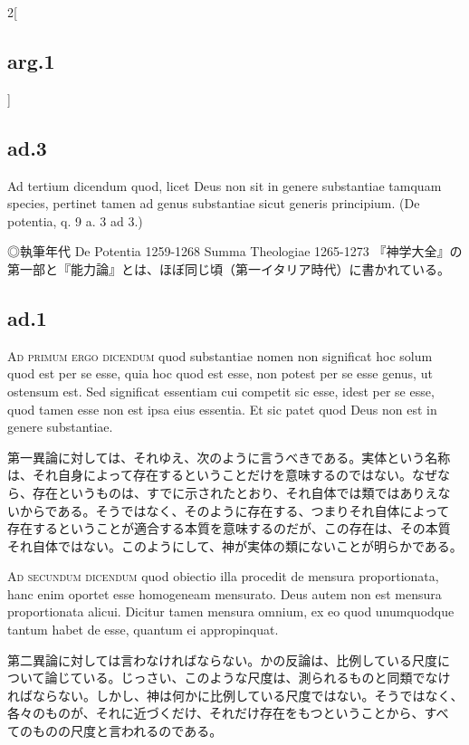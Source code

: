 \documentclass[paper=a4paper,fontsize=10pt,jafontsize=9pt,titlepage]{jlreq}
\begin{document}
\begin{paracol}{2}[\subsection{arg.1}]
{\subsection{ad.3}

Ad tertium dicendum quod, licet Deus non sit in genere substantiae
 tamquam species, pertinet tamen ad genus substantiae sicut generis
 principium. (De potentia, q. 9 a. 3 ad 3.)



◎執筆年代
De Potentia 1259-1268
Summa Theologiae 1265-1273
『神学大全』の第一部と『能力論』とは、ほぼ同じ頃（第一イタリア時代）に書かれている。
}

\subsection{ad.1}

{\scshape Ad primum ergo dicendum} quod substantiae nomen non
significat hoc solum quod est per se esse, quia hoc quod est esse, non
potest per se esse genus, ut ostensum est. Sed significat essentiam
cui competit sic esse, idest per se esse, quod tamen esse non est ipsa
eius essentia. Et sic patet quod Deus non est in genere substantiae.

\switchcolumn

第一異論に対しては、それゆえ、次のように言うべきである。実体という名称
は、それ自身によって存在するということだけを意味するのではない。なぜな
ら、存在というものは、すでに示されたとおり、それ自体では類ではありえな
いからである。そうではなく、そのように存在する、つまりそれ自体によって
存在するということが適合する本質を意味するのだが、この存在は、その本質
それ自体ではない。このようにして、神が実体の類にないことが明らかである。

\switchcolumn*[\subsection{ad.2}]

{\scshape Ad secundum dicendum} quod obiectio illa procedit de mensura
proportionata, hanc enim oportet esse homogeneam mensurato. Deus autem
non est mensura proportionata alicui. Dicitur tamen mensura omnium, ex
eo quod unumquodque tantum habet de esse, quantum ei appropinquat.

\switchcolumn

第二異論に対しては言わなければならない。かの反論は、比例している尺度に
ついて論じている。じっさい、このような尺度は、測られるものと同類でなけ
ればならない。しかし、神は何かに比例している尺度ではない。そうではなく、
各々のものが、それに近づくだけ、それだけ存在をもつということから、すべ
てのものの尺度と言われるのである。

\end{paracol}
\end{document}
